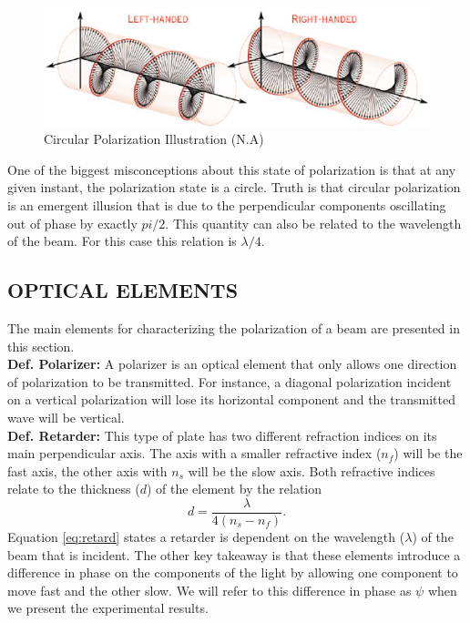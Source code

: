 \begin{figure}[H]
    \centering
    \includegraphics[scale=0.40]{Figures/Circular_Polarization.jpg}
    \caption{Circular Polarization Illustration (N.A)}
    \label{fig:CircularPol}
\end{figure}

One of the biggest misconceptions about this state of polarization is that at any given instant, the polarization state is a circle. Truth is that circular polarization is an emergent illusion that is due to the perpendicular components oscillating out of phase by exactly $pi/2$. This quantity can also be related to the wavelength of the beam. For this case this relation is $\lambda/4$.

\subsection{OPTICAL ELEMENTS}
The main elements for characterizing the polarization of a beam are presented in this section. \\

\textbf{Def. Polarizer:} A polarizer is an optical element that only allows one direction of polarization to be transmitted. For instance, a diagonal polarization incident on a vertical polarization will lose its horizontal component and the transmitted wave will be vertical. \\


\textbf{Def. Retarder:} This type of plate has two different refraction indices on its main perpendicular axis. The axis with a smaller refractive index ($n_f$) will be the fast axis, the other axis with $n_s$ will be the slow axis. Both refractive indices relate to the thickness ($d$) of the element by the relation
\begin{equation}
    d = \frac{\lambda}{4(n_s-n_f)}.
    \label{eq:retard}
\end{equation}
Equation \ref{eq:retard} states a retarder is dependent on the wavelength ($\lambda$) of the beam that is incident. The other key takeaway is that these elements introduce a difference in phase on the components of the light by allowing one component to move fast and the other slow. We will refer to this difference in phase as $\psi$ when we present the experimental results.  


